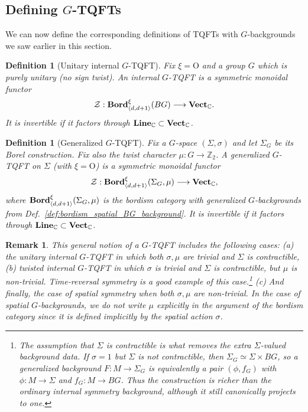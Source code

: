 \documentclass[aps,prx,reprint,superscriptaddress,twocolumn,amsmath,amssymb,amsfonts, nofootinbib]{revtex4-2}
\newcommand{\bordd}{{\bf Bord}_{\langle d, d+1\rangle}}
\newcommand{\vect}{{\bf Vect}_{\mathbb{C}}}
\newcommand{\Line}{{\bf Line}_{\mathbb{C}}}
\newcommand{\Z}{\mathbb{Z}}
\theoremstyle{apsstyle}
\newtheorem{definition}[theorem]{Definition}
\newtheorem{remark}[theorem]{Remark}
\begin{document}
\subsection{Defining $G$-TQFTs}
\label{app:GTQFT}

We can now define the corresponding definitions of TQFTs with $G$-backgrounds we saw earlier in this section. 

\bigskip 

\begin{definition}[Unitary internal $G$-TQFT]
\label{def:internal_GTQFT}
Fix $\xi=\mathrm{O}$ and a group $G$ which is purely unitary (no sign twist). An internal $G$-TQFT is a symmetric monoidal functor
\begin{equation*}
\mathcal Z:\bordd^{\xi}(BG)\longrightarrow \vect .
\end{equation*}
It is invertible if it factors through $\Line\subset\vect$.
\end{definition}

\bigskip 



\begin{definition}[Generalized $G$-TQFT]
\label{def:spatial_GTQFT}
Fix a $G$-space $(\Sigma,\sigma)$ and let $\Sigma_G$ be its Borel construction. Fix also the twist character $\mu: G\to \Z_{2}$. A generalized $G$-TQFT on $\Sigma$ (with $\xi=\mathrm{O}$) is a symmetric monoidal functor
\begin{equation*}
    \mathcal Z:\bordd^{\xi}(\Sigma_G, \mu)\longrightarrow \vect,
\end{equation*}
where $\bordd^{\xi}(\Sigma_G, \mu)$ is the bordism category with generalized $G$-backgrounds from Def.~\ref{def:bordism_spatial_BG_background}. It is invertible if it factors through $\Line\subset\vect$.
\end{definition}

\bigskip 

\begin{remark}
This general notion of a $G$-TQFT includes the following cases: (a) the unitary internal $G$-TQFT in which both $\sigma,\mu$ are trivial and $\Sigma$ is contractible, (b) twisted internal $G$-TQFT in which $\sigma$ is trivial and $\Sigma$ is contractible, but $\mu$ is non-trivial. Time-reversal symmetry is a good example of this case.\footnote{The assumption that $\Sigma$ is contractible is what removes the extra $\Sigma$-valued background data. If $\sigma=1$ but $\Sigma$ is not contractible, then $\Sigma_G\simeq\Sigma\times BG$, so a generalized background $F:M\to\Sigma_G$ is equivalently a pair $(\phi,f_G)$ with $\phi:M\to\Sigma$ and $f_G:M\to BG$. Thus the construction is richer than the ordinary internal symmetry background, although it still canonically projects to one.} (c) And finally, the case of spatial symmetry when both $\sigma,\mu$ are non-trivial. In the case of spatial $G$-backgrounds, we do not write $\mu$ explicitly in the argument of the bordism category since it is defined implicitly by the spatial action $\sigma$. 
\end{remark}
\end{document}
